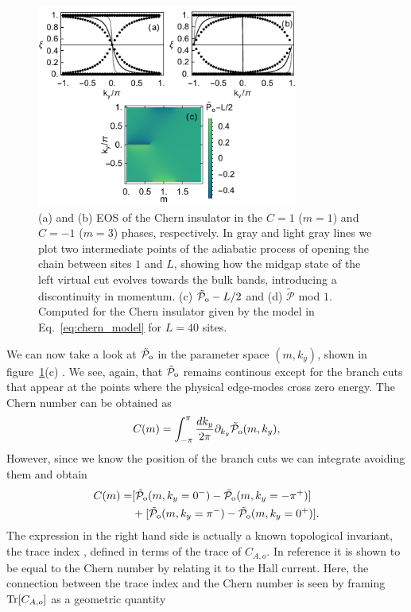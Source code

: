 \documentclass[twocolumn,amsmath,longbibliography,amssymb,superscriptaddress]{revtex4-1}
\newcommand{\tpo}{\tilde{\mathcal{P}}_{\rm o}}
\begin{document}
\begin{figure}[t]
\centering
\includegraphics[width=86mm]{fig7comp.pdf}
\caption{(a) and (b) EOS of the Chern insulator in the $C=1$ ($m=1$) and $C=-1$ ($m=3$) phases, respectively. In gray and light gray lines we plot two intermediate points of the adiabatic process of opening the chain between sites $1$ and $L$, showing how the midgap state of the left virtual cut evolves towards the bulk bands, introducing a discontinuity in momentum. (c) $\tpo-L/2$ and (d) $\tilde{\mathcal{P}}$ mod $1$. Computed for the Chern insulator given by the model in Eq.~\eqref{eq:chern_model} for $L=40$ sites. }
	\label{chern_insulator}
\end{figure}

We can now take a look at $\tpo$ in the parameter space $(m,k_y)$, shown in figure~\ref{chern_insulator}(c) . We see, again, that $\tpo$ remains continous except for the branch cuts that appear at the points where the physical edge-modes cross zero energy. The Chern number can be obtained as
\begin{equation}
C(m) = \int_{-\pi}^{\pi}\frac{dk_y}{2\pi} \partial_{k_y} \tpo(m,k_y),
\label{eq:Zaletel_chern}
\end{equation}
However, since we know the position of the branch cuts we can integrate avoiding them and obtain
\begin{align}
C(m) =& [\tpo(m,k_y=0^-)-\tpo(m,k_y=-\pi^+)]\\
&+[\tpo(m,k_y=\pi^-)-\tpo(m,k_y=0^+)].
\end{align}
The expression in the right hand side is actually a known topological invariant, the trace index \cite{Alexandrinata2011}, defined in terms of the trace of $C_{A,o}$. In reference \cite{Alexandrinata2011} it is shown to be equal to the Chern number by relating it to the Hall current. Here, the connection between the trace index and the Chern number is seen by framing $\Tr[C_{A,o}]$ as a geometric quantity 
\end{document}
